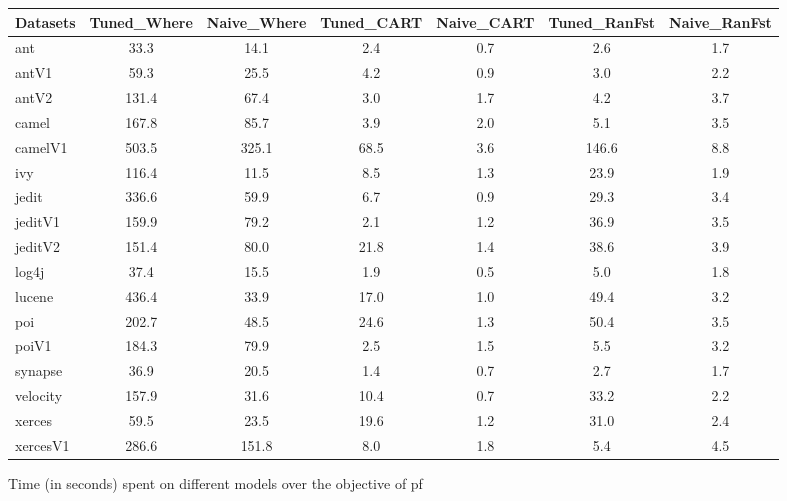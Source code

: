 \documentclass{sig-alternative}
\def\baselinestretch{1}
\begin{document}
\begin{figure}[!ht]

\renewcommand{\baselinestretch}{0.7}
\scriptsize
\centering
  \begin{tabular}{l|c |c |c |c |c |c }
    \hline\hline
    Datasets & Tuned\_Where & Naive\_Where & Tuned\_CART & Naive\_CART & Tuned\_RanFst & Naive\_RanFst\\
    \hline
    ant & 33.3 & 14.1 & 2.4 & 0.7 & 2.6 & 1.7\\
    antV1 & 59.3 & 25.5 & 4.2 & 0.9 & 3.0 & 2.2\\
    antV2 & 131.4 & 67.4 & 3.0 & 1.7 & 4.2 & 3.7\\
    camel & 167.8 & 85.7 & 3.9 & 2.0 & 5.1 & 3.5\\
    camelV1 & 503.5 & 325.1 & 68.5 & 3.6 & 146.6 & 8.8\\
    ivy & 116.4 & 11.5 & 8.5 & 1.3 & 23.9 & 1.9\\
    jedit & 336.6 & 59.9 & 6.7 & 0.9 & 29.3 & 3.4\\
    jeditV1 & 159.9 & 79.2 & 2.1 & 1.2 & 36.9 & 3.5\\
    jeditV2 & 151.4 & 80.0 & 21.8 & 1.4 & 38.6 & 3.9\\
    log4j & 37.4 & 15.5 & 1.9 & 0.5 & 5.0 & 1.8\\
    lucene & 436.4 & 33.9 & 17.0 & 1.0 & 49.4 & 3.2\\
    poi & 202.7 & 48.5 & 24.6 & 1.3 & 50.4 & 3.5\\
    poiV1 & 184.3 & 79.9 & 2.5 & 1.5 & 5.5 & 3.2\\
    synapse & 36.9 & 20.5 & 1.4 & 0.7 & 2.7 & 1.7\\
    velocity & 157.9 & 31.6 & 10.4 & 0.7 & 33.2 & 2.2\\
    xerces & 59.5 & 23.5 & 19.6 & 1.2 & 31.0 & 2.4\\
    xercesV1 & 286.6 & 151.8 & 8.0 & 1.8 & 5.4 & 4.5\\
  \end{tabular}
  \caption{Time (in seconds) spent on different models over the objective of pf}
\end{figure}
\end{document}
